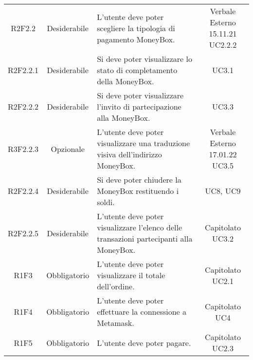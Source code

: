 \begin{table}[H]
\begin{tabular}{c | c | p{6cm} | c }
        R2F2.2                                                            & Desiderabile & L'utente deve poter scegliere la tipologia di pagamento MoneyBox\glo{}.                       & \Shortunderstack{Verbale Esterno 15.11.21\\UC2.2.2\\}      \\
        R2F2.2.1                                                          & Desiderabile & Si deve poter visualizzare lo stato di completamento della MoneyBox\glo{}.                    & UC3.1                                 \\
        R2F2.2.2                                                          & Desiderabile & Si deve poter visualizzare l'invito di partecipazione alla MoneyBox\glo{}.                    & UC3.3                                 \\
        R3F2.2.3                                                          & Opzionale    & L'utente deve poter visualizzare una traduzione visiva dell'indirizzo MoneyBox\glo{}.         & \Shortunderstack{Verbale Esterno 17.01.22\\UC3.5\\}        \\
        R2F2.2.4                                                          & Desiderabile & Si deve poter chiudere la MoneyBox\glo{} restituendo i soldi.                                 & UC8, UC9                                  \\
        R2F2.2.5                                                          & Desiderabile & L'utente deve poter visualizzare l'elenco delle transazioni partecipanti alla MoneyBox\glo{}. & \Shortunderstack{Capitolato\\UC3.2\\} \\
        R1F3                                                              & Obbligatorio & L'utente deve poter visualizzare il totale dell'ordine.                                       & \Shortunderstack{Capitolato\\UC2.1\\} \\
        R1F4                                                              & Obbligatorio & L'utente deve poter effettuare la connessione a Metamask\glo{}.                               & \Shortunderstack{Capitolato\\UC4\\}   \\
        R1F5                                                              & Obbligatorio & L'utente deve poter pagare.                                                                   & \Shortunderstack{Capitolato\\UC2.3\\} \\
    \end{tabular}
\end{table}
